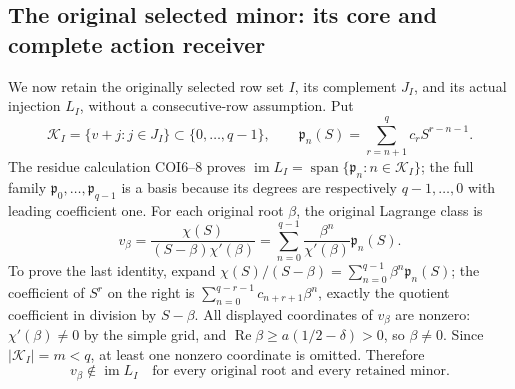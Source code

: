 \documentclass[11pt,a4paper]{article}
\begin{document}
\subsection{The original selected minor: its core and complete action receiver}

We now retain the originally selected row set \(I\), its complement
\(J_I\), and its actual injection \(L_I\), without a consecutive-row
assumption.  Put
\[
 \mathcal K_I=\{v+j:j\in J_I\}\subset\{0,\ldots,q-1\},\qquad
 \mathfrak p_n(S)=\sum_{r=n+1}^q c_rS^{r-n-1}.
 \]
The residue calculation COI6--8 proves
\(\operatorname{im}L_I=\operatorname{span}\{\mathfrak p_n:
n\in\mathcal K_I\}\); the full family
\(\mathfrak p_0,\ldots,\mathfrak p_{q-1}\) is a basis because its
degrees are respectively \(q-1,\ldots,0\) with leading coefficient
one.
For each original root \(\beta\), the original Lagrange class is
\[
 v_\beta=\frac{\chi(S)}{(S-\beta)\chi'(\beta)}
       =\sum_{n=0}^{q-1}
               \frac{\beta^n}{\chi'(\beta)}\mathfrak p_n(S).
 \]
To prove the last identity, expand
\(\chi(S)/(S-\beta)=\sum_{n=0}^{q-1}\beta^n\mathfrak p_n(S)\);
the coefficient of \(S^r\) on the right is
\(\sum_{n=0}^{q-r-1}c_{n+r+1}\beta^n\), exactly the quotient
coefficient in division by \(S-\beta\).
All displayed coordinates of \(v_\beta\) are nonzero:
\(\chi'(\beta)\ne0\) by the simple grid, and
\(\operatorname{Re}\beta\geq a(1/2-\delta)>0\), so \(\beta\ne0\).
Since \(|\mathcal K_I|=m<q\), at least one nonzero coordinate is
omitted.  Therefore
\begin{equation}
 v_\beta\notin\operatorname{im}L_I
       \quad\text{for every original root and every retained minor.}
 \tag{CJA31}
\end{equation}
\end{document}
